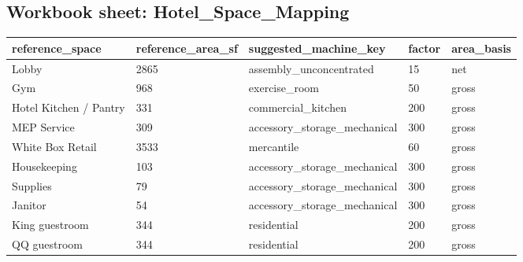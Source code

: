 \documentclass[10pt]{article}
\begin{document}
{\subsection*{Workbook sheet: Hotel\_Space\_Mapping}
\begin{longtable}{p{3.12cm}p{3.12cm}p{3.12cm}p{3.12cm}p{3.12cm}}
\toprule
\textbf{reference\_space} & \textbf{reference\_area\_sf} & \textbf{suggested\_machine\_key} & \textbf{factor} & \textbf{area\_basis} \\ \midrule \endhead
Lobby & 2865 & assembly\_unconcentrated & 15 & net \\
Gym & 968 & exercise\_room & 50 & gross \\
Hotel Kitchen / Pantry & 331 & commercial\_kitchen & 200 & gross \\
MEP Service & 309 & accessory\_storage\_mechanical & 300 & gross \\
White Box Retail & 3533 & mercantile & 60 & gross \\
Housekeeping & 103 & accessory\_storage\_mechanical & 300 & gross \\
Supplies & 79 & accessory\_storage\_mechanical & 300 & gross \\
Janitor & 54 & accessory\_storage\_mechanical & 300 & gross \\
King guestroom & 344 & residential & 200 & gross \\
QQ guestroom & 344 & residential & 200 & gross \\
\bottomrule\end{longtable}
}
\end{document}
